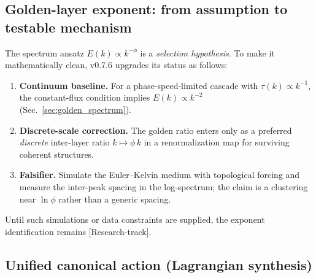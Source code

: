 \documentclass[10pt]{article}
\newcommand{\statusResearch}{\textsf{[Research-track]}}
\begin{document}
\subsection{Golden-layer exponent: from assumption to testable mechanism}
\label{sec:phi_exponent_program}

The spectrum ansatz $E(k)\propto k^{-\phi}$ is a \emph{selection hypothesis}.
To make it mathematically clean, v0.7.6 upgrades its status as follows:

\begin{enumerate}
\item \textbf{Continuum baseline.} For a phase-speed-limited cascade with $\tau(k)\propto k^{-1}$,
the constant-flux condition implies $E(k)\propto k^{-2}$ (Sec.~\ref{sec:golden_spectrum}).
\item \textbf{Discrete-scale correction.} The golden ratio enters only as a preferred \emph{discrete}
inter-layer ratio $k\mapsto \phi\,k$ in a renormalization map for surviving coherent structures.
\item \textbf{Falsifier.} Simulate the Euler--Kelvin medium with topological forcing and measure the
inter-peak spacing in the log-spectrum; the claim is a clustering near $\ln\phi$ rather than a
generic spacing.
\end{enumerate}

Until such simulations or data constraints are supplied, the exponent identification remains
\statusResearch.

\subsection{Unified canonical action (Lagrangian synthesis)}
\label{sec:unified_action_synthesis}
\end{document}

